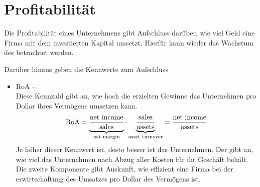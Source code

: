 \section{Profitabilität}
Die Profitabilität eines Unternehmens gibt Aufschluss darüber, wie viel Geld eine Firma mit dem investierten Kapital umsetzt.
Hierfür kann wieder das Wachstum des  betrachtet werden.

Darüber hinaus geben die Kennwerte zum  Aufschluss
\begin{itemize}
    \item RoA -- \\
    Diese Kennzahl gibt an, wie hoch die erzielten Gewinne das Unternehmen pro Dollar ihres Vermögens umsetzen kann.
    \begin{align}
        \text{RoA} = \underbrace{\frac{\text{net income}}{\text{sales}}}_{\text{net margin}} \cdot \underbrace{\frac{\text{sales}}{\text{assets}}}_{\text{asset turnover}} = \frac{\text{net income}}{\text{assets}}
    \end{align}
    Je höher dieser Kennwert ist, desto besser ist das Unternehmen.
    Der \netMargin gibt an, wie viel das Unternehmen nach Abzug aller Kosten für ihr Geschäft behält.
    Die zweite Komponente \assetTurnover gibt Auskunft, wie effizient eine Firma bei der erwirtschaftung des Umsatzes pro Dollar des Vermögens ist.


\end{itemize}
